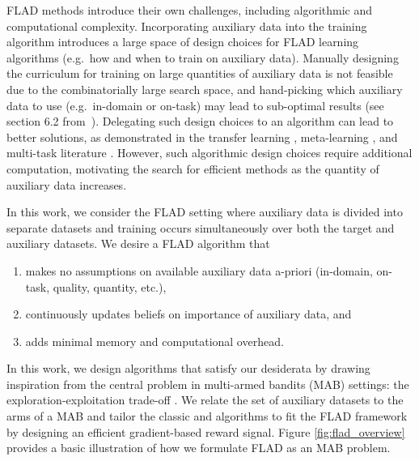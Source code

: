 
FLAD methods introduce their own challenges, including algorithmic and computational complexity.
Incorporating auxiliary data into the training algorithm introduces a large space of design choices for FLAD learning algorithms (e.g.\ how and when to train on auxiliary data).
Manually designing the curriculum for training on large quantities of auxiliary data is not feasible due to the combinatorially large search space, and hand-picking which auxiliary data to use (e.g.\ in-domain or on-task) may lead to sub-optimal results (see section 6.2 from~\citet{feta_albalak}).
Delegating such design choices to an algorithm can lead to better solutions, as demonstrated in the transfer learning \citep{vu-etal-2020-exploring, pruksachatkun-etal-2020-intermediate}, meta-learning \citep{10.5555/296635, bansal-etal-2020-self}, and multi-task literature \citep{Wu2020Understanding, aghajanyan-etal-2021-muppet}. However, such algorithmic design choices require additional computation, motivating the search for efficient methods as the quantity of auxiliary data increases.

In this work, we consider the FLAD setting where auxiliary data is divided into separate datasets and training occurs simultaneously over both the target and auxiliary datasets. We desire a FLAD algorithm that

\begin{enumerate}[nosep]
    \item makes no assumptions on available auxiliary data a-priori (in-domain, on-task, quality, quantity, etc.),
    \item continuously updates beliefs on importance of auxiliary data, and
    \item adds minimal memory and computational overhead.
\end{enumerate}

In this work, we design algorithms that satisfy our desiderata by drawing inspiration from the central problem in multi-armed bandits (MAB) settings: the exploration-exploitation trade-off \citep{macready1998bandit, simpkins2008optimal}. We relate the set of auxiliary datasets to the arms of a MAB and tailor the classic \ex{} \citep{auer2002nonstochastic} and \ucb{} \citep{auer2002finite} algorithms to fit the FLAD framework by designing an efficient gradient-based reward signal. Figure \ref{fig:flad_overview} provides a basic illustration of how we formulate FLAD as an MAB problem.

